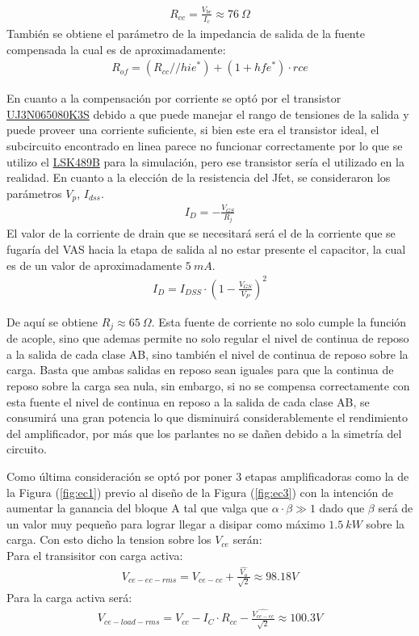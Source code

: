 \begin{align}
R_{cc}=\frac{V_{be}}{I_c}\approx 76 \ \Omega
\end{align}
También se obtiene el parámetro de la impedancia de salida de la fuente compensada la cual es de aproximadamente:
\begin{align}
R_{of} = (R_{cc} // hie^*)+(1+hfe^* )\cdot rce
\end{align}

En cuanto a la compensación por corriente se optó por el transistor \href{https://ar.mouser.com/datasheet/2/827/DS_UJ3N065080K3S-1530401.pdf}{UJ3N065080K3S} debido a que puede manejar el rango de tensiones de la salida y puede proveer una corriente suficiente, si bien este era el transistor ideal, el subcircuito encontrado en linea parece no funcionar correctamente por lo que se utilizo el \href{http://www.linearsystems.com/lsdata/datasheets/LSK489_LOW_NOISE,_LOW_CAPACITANCE_MONOLITHIC_DUAL_N-CHANNEL_JFET.pdf}{LSK489B} para la simulación, pero ese transistor sería el utilizado en la realidad. En cuanto a la  elección de la resistencia del Jfet, se consideraron los parámetros $V_p$, $I_{dss}$.
\begin{align}
I_D=-\frac{V_{GS}}{R_j}
\end{align}
El valor de la corriente de drain que se necesitará será el de la corriente que se fugaría del VAS hacia la etapa de salida al no estar presente el capacitor, la cual es de un valor de aproximadamente $5 \ mA$.
\begin{align}
I_D= I_{DSS} \cdot \left(1-\frac{V_{GS}}{V_P} \right)^2
\end{align}

De aquí se obtiene $R_j \approx 65 \ \Omega$. Esta fuente de corriente no solo cumple la función de acople, sino que ademas permite no solo regular el nivel de continua de reposo a la salida de cada clase AB, sino también el nivel de continua de reposo sobre la carga. Basta que ambas salidas en reposo sean iguales para que la continua de reposo sobre la carga sea nula, sin embargo, si no se compensa correctamente con esta fuente el nivel de continua en reposo a la salida de cada clase AB, se consumirá una gran potencia lo que disminuirá considerablemente el rendimiento del amplificador, por más que los parlantes no se dañen debido a la simetría del circuito.

Como última consideración se optó por poner 3 etapas amplificadoras como la de la Figura (\ref{fig:ec1}) previo al diseño de la Figura (\ref{fig:ec3}) con la intención de aumentar la ganancia del bloque A tal  que valga que $\alpha \cdot \beta \gg 1$ dado que $\beta$ será de un valor muy pequeño para lograr llegar a disipar como máximo $1.5 \ kW$ sobre la carga.
Con esto dicho la tension sobre los $V_{ce}$ serán:\\
Para el transisitor con carga activa:
\begin{align}
V_{ce-ec-rms}= V_{ce-cc}+\frac{ \hat{V_o}}{\sqrt{2}}\approx 98.18V 
\end{align}
Para la carga activa será:
\begin{align}
V_{ce-load-rms}= V_{cc}-I_C \cdot R_{cc}-\frac{\hat{V_{ce-ec}}}{\sqrt{2}}\approx 100.3V
\end{align}


%
